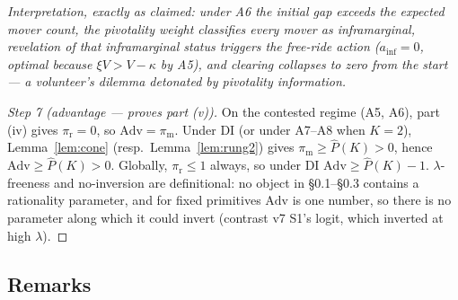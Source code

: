 \noindent\emph{Interpretation, exactly as claimed: under A6 the initial gap exceeds the expected mover count, the pivotality weight classifies every mover as inframarginal, revelation of that inframarginal status triggers the free-ride action ($a_{\mathrm{inf}} = 0$, optimal because $\xi V > V - \kappa$ by A5), and clearing collapses to zero from the start --- a volunteer's dilemma detonated by pivotality information.}

\begin{proof}[Step 7 (advantage --- proves part (v))]
On the contested regime (A5, A6), part (iv) gives $\pi_{\mathrm{r}} = 0$, so $\mathrm{Adv} = \pi_{\mathrm{m}}$. Under DI (or under A7--A8 when $K = 2$), Lemma~\ref{lem:cone} (resp.\ Lemma~\ref{lem:rung2}) gives $\pi_{\mathrm{m}} \ge \widehat P(K) > 0$, hence $\mathrm{Adv} \ge \widehat P(K) > 0$. Globally, $\pi_{\mathrm{r}} \le 1$ always, so under DI $\mathrm{Adv} \ge \widehat P(K) - 1$. $\lambda$-freeness and no-inversion are definitional: no object in \S 0.1--\S 0.3 contains a rationality parameter, and for fixed primitives $\mathrm{Adv}$ is one number, so there is no parameter along which it could invert (contrast v7 S1's logit, which inverted at high $\lambda$).
\end{proof}

\subsection*{Remarks}

